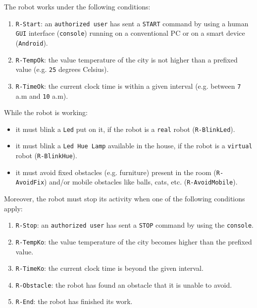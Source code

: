 \documentclass{../llncs}
\newcommand{\code}[1]{{\color{blue}\small{\texttt{#1}}}}
\newcommand{\fname}[1]{{\small{\color{magenta}\texttt{#1}}}}
\begin{document}
\noindent The robot works under the following conditions:
\begin{enumerate}
\item \code{R-Start}: an \code{authorized user} has sent a \texttt{START} command by using a human \texttt{GUI} interface (\code{console}) running
on a conventional PC or on a smart device (\texttt{Android}).
\item \code{R-TempOk}: the value temperature of the city is not higher than a prefixed value (e.g. \texttt{25} degrees Celsius).
\item \code{R-TimeOk}: the current clock time is within a given interval (e.g. between \texttt{7} a.m and \texttt{10} a.m).
\end{enumerate}

\noindent While the robot is working:
\begin{itemize}[label={--}]
\item it must blink a \texttt{Led} put on it, if the robot is a \fname{real} robot (\code{R-BlinkLed}).
\item it must blink a \texttt{Led Hue Lamp} available in the house, if the robot is a \fname{virtual} robot (\code{R-BlinkHue}).
\item it must avoid fixed obstacles (e.g. furniture) present in the room (\code{R-AvoidFix}) and/or mobile obstacles like
balls, cats, etc. (\code{R-AvoidMobile}).
\end{itemize}

Moreover, the robot must stop its activity when one of the following conditions apply:
\begin{enumerate}
\item \code{R-Stop}: an \code{authorized user} has sent a \texttt{STOP} command by using the \code{console}.
\item \code{R-TempKo}: the value temperature of the city becomes higher than the prefixed value.
\item \code{R-TimeKo}: the current clock time is beyond the given interval.
\item \code{R-Obstacle}: the robot has found an obstacle that it is unable to avoid.
\item \code{R-End}: the robot has finished its work.
\end{enumerate}
\end{document}
